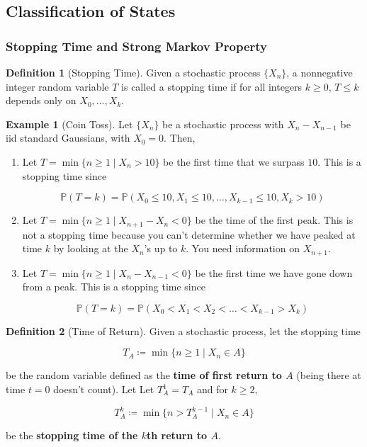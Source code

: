 \documentclass{article}
\theoremstyle{definition}
\newtheorem{example}{Example}[section]
\theoremstyle{remark}
\theoremstyle{definition}
\newtheorem{definition}{Definition}[section]
\begin{document}
  \subsection{Classification of States}

    \subsubsection{Stopping Time and Strong Markov Property}

      \begin{definition}[Stopping Time]
        Given a stochastic process $\{X_n\}$, a nonnegative integer random variable $T$ is called a stopping time if for all integers $k \geq 0$, $T \leq k$ depends only on $X_0, \ldots, X_k$. 
      \end{definition}

      \begin{example}[Coin Toss]
        Let $\{X_n\}$ be a stochastic process with $X_n - X_{n - 1}$ be iid standard Gaussians, with $X_0 = 0$. Then, 
        \begin{enumerate}
          \item Let $T = \min\{n \geq 1 \mid X_n > 10\}$ be the first time that we surpass $10$. This is a stopping time since 

            \[\mathbb{P}(T = k) = \mathbb{P}(X_0 \leq 10, X_1 \leq 10, \ldots, X_{k-1} \leq 10, X_{k} > 10)\]
          
          \item Let $T = \min\{n \geq 1 \mid X_{n+1} - X_n < 0\}$ be the time of the first peak. This is not a stopping time because you can't determine whether we have peaked at time $k$ by looking at the $X_n$'s up to $k$. You need information on $X_{n + 1}$. 
          
          \item Let $T = \min\{n \geq 1 \mid X_{n} - X_{n-1} < 0\}$ be the first time we have gone down from a peak. This is a stopping time since 

            \[\mathbb{P}(T = k) = \mathbb{P}(X_0 < X_1 < X_2 < \ldots < X_{k-1} > X_k)\]
        \end{enumerate}
      \end{example}

      \begin{definition}[Time of Return]
        Given a stochastic process, let the stopping time 

          \[T_A \coloneqq \min \{ n \geq 1 \mid X_n \in A\}\]

        be the random variable defined as the \textbf{time of first return to $A$} (being there at time $t = 0$ doesn't count). Let 
        Let $T^1_A = T_A$ and for $k \geq 2$, 

          \[T_A^k \coloneqq \min \{ n > T^{k-1}_A \mid X_n \in A\}\]

        be the \textbf{stopping time of the $k$th return to $A$}. 
      \end{definition}
\end{document}
